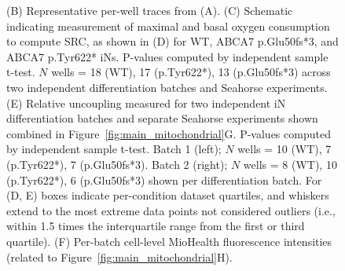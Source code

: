 \begin{figure}[ht]
{         (B) Representative per-well traces from (A). 
         (C) Schematic indicating measurement of maximal and basal oxygen consumption to compute SRC, as shown in 
         (D) for WT, ABCA7 p.Glu50fs*3, and ABCA7 p.Tyr622* iNs. P-values computed by independent sample t-test. $N$ wells = 18 (WT), 17 (p.Tyr622*), 13 (p.Glu50fs*3) across two independent differentiation batches and Seahorse experiments. 
         (E) Relative uncoupling measured for two independent iN differentiation batches and separate Seahorse experiments shown combined in Figure~\ref{fig:main_mitochondrial}G. P-values computed by independent sample t-test. Batch 1 (left); $N$ wells = 10 (WT), 7 (p.Tyr622*), 7 (p.Glu50fs*3). Batch 2 (right); $N$ wells = 8 (WT), 10 (p.Tyr622*), 6 (p.Glu50fs*3) shown per differentiation batch. For (D, E) boxes indicate per-condition dataset quartiles, and whiskers extend to the most extreme data points not considered outliers (i.e., within 1.5 times the interquartile range from the first or third quartile). 
         (F) Per-batch cell-level MioHealth fluorescence intensities (related to Figure~\ref{fig:main_mitochondrial}H).
     }
     \label{fig:oxygen_consumption_rates_iPSC_neurons}
 \end{figure}